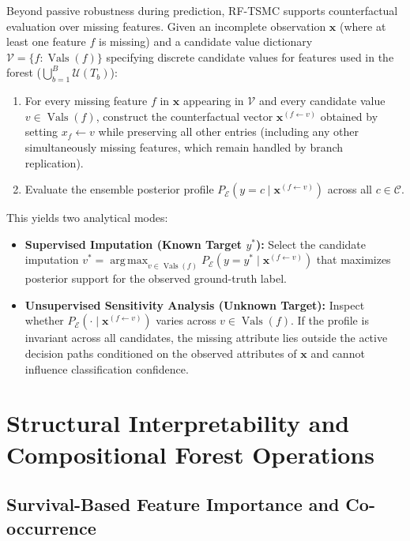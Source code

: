 \documentclass[11pt,a4paper]{article}
\DeclareMathOperator*{\argmax}{arg\,max}
\DeclareMathOperator{\Vals}{Vals}
\begin{document}
Beyond passive robustness during prediction, RF-TSMC supports counterfactual evaluation over missing features. Given an incomplete observation $\mathbf{x}$ (where at least one feature $f$ is missing) and a candidate value dictionary $\mathcal{V} = \{f : \Vals(f)\}$ specifying discrete candidate values for features used in the forest ($\bigcup_{b=1}^B \mathcal{U}(T_b)$):
\begin{enumerate}[leftmargin=*, itemsep=3pt]
  \item For every missing feature $f$ in $\mathbf{x}$ appearing in $\mathcal{V}$ and every candidate value $v \in \Vals(f)$, construct the counterfactual vector $\mathbf{x}^{(f \leftarrow v)}$ obtained by setting $x_f \gets v$ while preserving all other entries (including any other simultaneously missing features, which remain handled by branch replication).
  \item Evaluate the ensemble posterior profile $P_{\mathcal{E}}(y = c \mid \mathbf{x}^{(f \leftarrow v)})$ across all $c \in \mathcal{C}$.
\end{enumerate}
This yields two analytical modes:
\begin{itemize}[leftmargin=*, itemsep=3pt]
  \item \textbf{Supervised Imputation (Known Target $y^*$):} Select the candidate imputation $v^* = \allowbreak \argmax_{v \in \Vals(f)} P_{\mathcal{E}}(y = y^* \mid \mathbf{x}^{(f \leftarrow v)})$ that maximizes posterior support for the observed ground-truth label.
  \item \textbf{Unsupervised Sensitivity Analysis (Unknown Target):} Inspect whether $P_{\mathcal{E}}(\cdot \mid \mathbf{x}^{(f \leftarrow v)})$ varies across $v \in \Vals(f)$. If the profile is invariant across all candidates, the missing attribute lies outside the active decision paths conditioned on the observed attributes of $\mathbf{x}$ and cannot influence classification confidence.
\end{itemize}

\section{Structural Interpretability and Compositional Forest Operations}

\subsection{Survival-Based Feature Importance and Co-occurrence}
\label{sec:importance}
\end{document}
